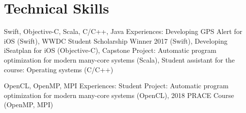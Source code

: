 \documentclass[11pt,a4paper,sans]{moderncv}        %
\begin{document}
\section{Technical Skills}
					{Swift, Objective-C, Scala, C/C++, Java}{}{}{}
					{Experiences:
					 Developing GPS Alert for iOS (Swift), 
					 WWDC Student Scholarship Winner 2017 (Swift), 
					 Developing iSeatplan for iOS (Objective-C), 
					 Capstone Project: Automatic program optimization for modern many-core systems (Scala), 
					 Student assistant for the course: Operating systems (C/C++)
					}
                    

					{OpenCL, OpenMP, MPI}{}{}{}
					{Experiences:
					 Student Project: Automatic program optimization for modern many-core systems (OpenCL),
					 2018 PRACE Course (OpenMP, MPI)
					}



    
%
\end{document}
